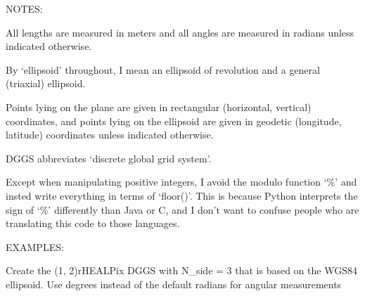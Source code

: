 \documentclass[a4paper,12ptopenany,oneside,english]{sphinxmanual}
\begin{document}
\sphinxAtStartPar
NOTES:

\sphinxAtStartPar
All lengths are measured in meters and all angles are measured in radians
unless indicated otherwise.

\sphinxAtStartPar
By ‘ellipsoid’ throughout, I mean an ellipsoid of revolution and  a general (triaxial) ellipsoid.

\sphinxAtStartPar
Points lying on the plane are given in rectangular (horizontal, vertical) coordinates, and points lying on the ellipsoid are given in geodetic (longitude, latitude) coordinates unless indicated otherwise.

\sphinxAtStartPar
DGGS abbreviates ‘discrete global grid system’.

\sphinxAtStartPar
Except when manipulating positive integers, I avoid the modulo function ‘\%’
and insted write everything in terms of ‘floor()’.
This is because Python interprets the sign of ‘\%’ differently than
Java or C, and I don’t want to confuse people who are translating this code
to those languages.

\sphinxAtStartPar
EXAMPLES:

\sphinxAtStartPar
Create the (1, 2)\sphinxhyphen{}rHEALPix DGGS with N\_side = 3 that is based on the WGS84 ellipsoid. Use degrees instead of the default radians for angular measurements

\begin{sphinxVerbatim}[commandchars=\\\{\}]
 
  
     
\end{sphinxVerbatim}
\end{document}
